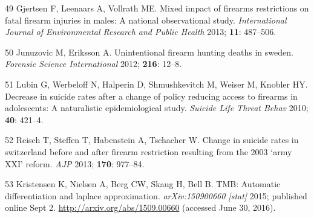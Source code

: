 \documentclass[]{article}
\begin{document}
\hypertarget{ref-gjertsenux5fmixedux5f2013}{}
49 Gjertsen F, Leenaars A, Vollrath ME. Mixed impact of firearms
restrictions on fatal firearm injuries in males: A national
observational study. \emph{International Journal of Environmental
Research and Public Health} 2013; \textbf{11}: 487--506.

\hypertarget{ref-junuzovicux5funintentionalux5f2012}{}
50 Junuzovic M, Eriksson A. Unintentional firearm hunting deaths in
sweden. \emph{Forensic Science International} 2012; \textbf{216}: 12--8.

\hypertarget{ref-lubinux5fdecreaseux5f2010}{}
51 Lubin G, Werbeloff N, Halperin D, Shmushkevitch M, Weiser M, Knobler
HY. Decrease in suicide rates after a change of policy reducing access
to firearms in adolescents: A naturalistic epidemiological study.
\emph{Suicide Life Threat Behav} 2010; \textbf{40}: 421--4.

\hypertarget{ref-reischux5fchangeux5f2013}{}
52 Reisch T, Steffen T, Habenstein A, Tschacher W. Change in suicide
rates in switzerland before and after firearm restriction resulting from
the 2003 `army XXI' reform. \emph{AJP} 2013; \textbf{170}: 977--84.

\hypertarget{ref-kristensenux5ftmb:ux5f2015}{}
53 Kristensen K, Nielsen A, Berg CW, Skaug H, Bell B. TMB: Automatic
differentiation and laplace approximation. \emph{arXiv:150900660
{[}stat{]}} 2015; published online Sept 2.
\url{http://arxiv.org/abs/1509.00660} (accessed June 30, 2016).
\end{document}
